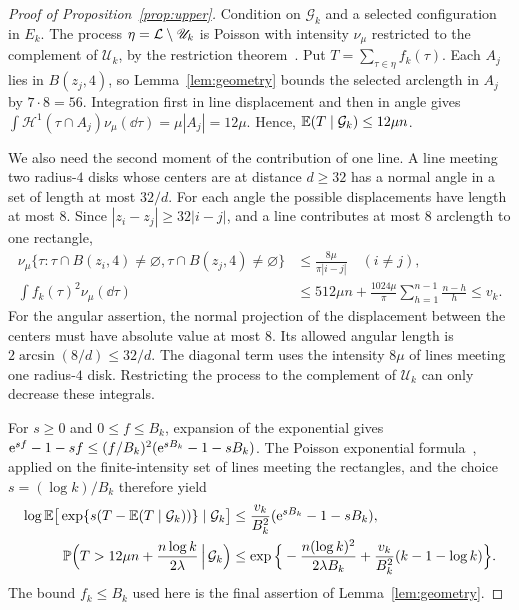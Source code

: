 \documentclass[11pt,letterpaper]{article}
\begin{document}
\begin{proof}[Proof of Proposition~\ref{prop:upper}]
Condition on $\mathcal G_k$ and a selected configuration in $E_k$. The process $\eta=\mathcal L\setminus\mathscr U_k$ is Poisson with intensity $\nu_\mu$ restricted to the complement of $\mathscr U_k$, by the restriction theorem~\cite[Theorem~5.2]{LP17}. Put $T=\sum_{\tau\in\eta}f_k(\tau)$. Each $A_j$ lies in $B(z_j,4)$, so Lemma~\ref{lem:geometry} bounds the selected arclength in $A_j$ by $7\cdot8=56$. Integration first in line displacement and then in angle gives $\int\mathcal H^1(\tau\cap A_j)\nu_\mu(\dd\tau)=\mu|A_j|=12\mu$. Hence, $\mathbb E(T\mid\mathcal G_k)\le12\mu n$.

We also need the second moment of the contribution of one line. A line meeting two radius-$4$ disks whose centers are at distance $d\ge32$ has a normal angle in a set of length at most $32/d$. For each angle the possible displacements have length at most $8$. Since $|z_i-z_j|\ge32|i-j|$, and a line contributes at most $8$ arclength to one rectangle,
\begin{equation}\label{eq:variance}
\begin{aligned}
 \nu_\mu\{\tau:\tau\cap B(z_i,4)\ne\varnothing,                      \tau\cap B(z_j,4)\ne\varnothing\}
 &\le\frac{8\mu}{\pi|i-j|}\quad(i\ne j),\\
 \int f_k(\tau)^2\nu_\mu(\dd\tau)
 &\le512\mu n+\frac{1024\mu}{\pi}
                       \sum_{h=1}^{n-1}\frac{n-h}{h}
 \le v_k.
\end{aligned}
\end{equation}
For the angular assertion, the normal projection of the displacement between the centers must have absolute value at most $8$. Its allowed angular length is $2\arcsin(8/d)\le32/d$. The diagonal term uses the intensity $8\mu$ of lines meeting one radius-$4$ disk. Restricting the process to the complement of $\mathscr U_k$ can only decrease these integrals.

For $s\ge0$ and $0\le f\le B_k$, expansion of the exponential gives $\mathrm{e}^{sf}-1-sf\le(f/B_k)^2(\mathrm{e}^{sB_k}-1-sB_k)$. The Poisson exponential formula~\cite[Exercise~3.4]{LP17}, applied on the finite-intensity set of lines meeting the rectangles, and the choice $s=(\log k)/B_k$ therefore yield
\begin{equation}\label{eq:poisson-tail}
\begin{aligned}
 \log\mathbb E\big[\exp\{s(T-\mathbb E(T\mid\mathcal G_k))\}\mid\mathcal G_k\big]
 &\le\frac{v_k}{B_k^2}(\mathrm{e}^{sB_k}-1-sB_k),\\
 \mathbb P\Big(T>12\mu n+\frac{n\log k}{2\lambda}\,\Big|\,\mathcal G_k\Big)
 &\le\exp\Big\{-\frac{n(\log k)^2}{2\lambda B_k}
               +\frac{v_k}{B_k^2}(k-1-\log k)\Big\}.
\end{aligned}
\end{equation}
The bound $f_k\le B_k$ used here is the final assertion of Lemma~\ref{lem:geometry}.


\end{proof}
\end{document}
